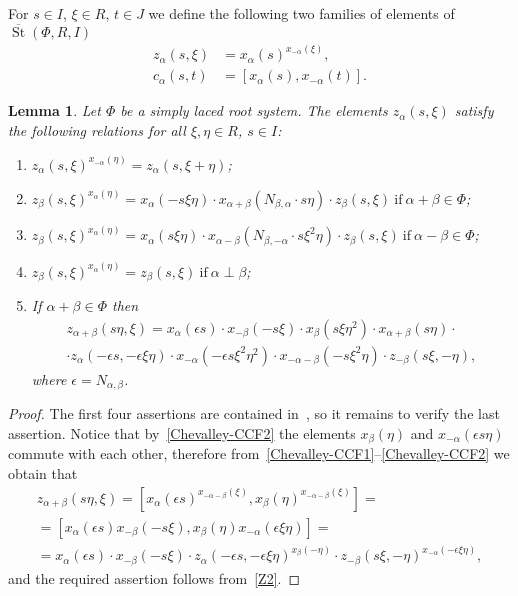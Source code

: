 \documentclass[oneside, 8pt]{amsart}
\newtheorem{lemma}{Lemma}
\theoremstyle{remark}
\theoremstyle{definition}
\numberwithin{lemma}{section}
\numberwithin{prop}{section}
\numberwithin{corollary}{section}
\numberwithin{externaltheorem}{section}
\DeclareMathOperator{\St}{St}
\numberwithin{equation}{section}
\begin{document}
For $s\in I$, $\xi \in R$, $t \in J$ we define the following two families of elements of $\overline{\St}(\Phi, R, I)$ 
\begin{align}
 z_\alpha(s, \xi) &= x_\alpha(s)^{x_{-\alpha}(\xi)}, \label{Zdef}\\
 c_\alpha(s, t)   &= [x_\alpha(s), x_{-\alpha}(t)]. \label{Cdef}
\end{align}

\begin{lemma}\label{Zrels} Let $\Phi$ be a simply laced root system.
The elements $z_\alpha(s, \xi)$ satisfy the following relations for all $\xi, \eta\in R$, $s\in I$:
\begin{enumerate} [label=\normalfont(\arabic*)]
\item\label{Z1} $z_{\alpha}(s, \xi) ^ {x_{-\alpha}(\eta)} = z_{\alpha}(s, \xi + \eta)$;
\item\label{Z2} $z_{\beta}(s, \xi) ^ {x_{\alpha}(\eta)} = x_{\alpha} (- s\xi \eta) \cdot x_{\alpha+\beta} (N_{\beta, \alpha}\cdot s\eta)     \cdot z_{\beta}(s, \xi)\ \text{if}\ \alpha + \beta \in \Phi$;
\item\label{Z3} $z_{\beta}(s, \xi) ^ {x_{\alpha}(\eta)} = x_{\alpha} (s\xi \eta) \cdot x_{\alpha-\beta} (N_{\beta,-\alpha}\cdot s\xi^2\eta) \cdot z_{\beta}(s, \xi)\ \text{if}\ \alpha - \beta \in \Phi$;

\item\label{Z4} $z_{\beta}(s, \xi) ^ {x_{\alpha}(\eta)} = z_{\beta}(s, \xi)\ \text{if}\ \alpha\perp\beta$;
\item\label{Z5} If $\alpha+\beta\in\Phi$ then
\begin{multline*} z_{\alpha+\beta}(s\eta, \xi) = x_\alpha(\epsilon s)\cdot x_{-\beta}(-s\xi) \cdot x_{\beta}(s\xi\eta^2) \cdot x_{\alpha+\beta}(s \eta) \cdot \\ \cdot z_\alpha(-\epsilon s, -\epsilon \xi\eta) \cdot
  x_{-\alpha}(-\epsilon s\xi^2\eta^2) \cdot x_{-\alpha-\beta}(- s \xi^2 \eta) \cdot z_{-\beta}(s\xi, -\eta),\end{multline*}
 where $\epsilon = N_{\alpha,\beta}$.
\end{enumerate} \end{lemma}
\begin{proof}
The first four assertions are contained in~\cite[Lemma~9]{S15}, so it remains to verify the last assertion.
Notice that by~\eqref{Chevalley-CCF2} the elements $x_\beta(\eta)$ and $x_{-\alpha}(\epsilon s \eta)$ commute with each other, therefore from~\eqref{Chevalley-CCF1}--\eqref{Chevalley-CCF2} we obtain that
\begin{multline} \nonumber
  z_{\alpha+\beta}(s\eta, \xi) = [x_\alpha(\epsilon s)^{x_{-\alpha-\beta}(\xi)}, x_\beta(\eta)^{x_{-\alpha-\beta}(\xi)}] = \\
  = [x_\alpha(\epsilon s) x_{-\beta}(-s\xi), x_{\beta}(\eta) x_{-\alpha}(\epsilon \xi\eta)] = \\ 
  = x_\alpha(\epsilon s) \cdot x_{-\beta}(-s\xi) \cdot z_\alpha(-\epsilon s, -\epsilon \xi\eta)^{x_{\beta}(-\eta)} \cdot z_{-\beta}(s\xi, -\eta)^{x_{-\alpha}(-\epsilon \xi\eta)},
\end{multline} 
and the required assertion follows from~\ref{Z2}.
\end{proof}
\end{document}
